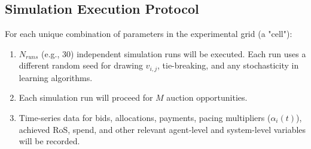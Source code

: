 \documentclass[12pt, a4paper]{article}
\begin{document}
\subsection{Simulation Execution Protocol}
For each unique combination of parameters in the experimental grid (a "cell"):
\begin{enumerate}
    \item $N_{runs}$ (e.g., 30) independent simulation runs will be executed. Each run uses a different random seed for drawing $v_{i,j}$, tie-breaking, and any stochasticity in learning algorithms.
    \item Each simulation run will proceed for $M$ auction opportunities.
    \item Time-series data for bids, allocations, payments, pacing multipliers ($\alpha_i(t)$), achieved RoS, spend, and other relevant agent-level and system-level variables will be recorded.
\end{enumerate}
\end{document}
